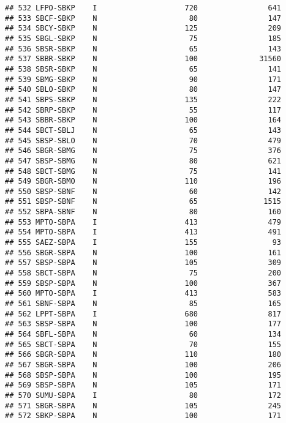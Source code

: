 \documentclass[
]{article}
\begin{document}
\begin{verbatim}
## 532 LFPO-SBKP    I                    720                641
## 533 SBCF-SBKP    N                     80                147
## 534 SBCY-SBKP    N                    125                209
## 535 SBGL-SBKP    N                     75                185
## 536 SBSR-SBKP    N                     65                143
## 537 SBBR-SBKP    N                    100              31560
## 538 SBSR-SBKP    N                     65                141
## 539 SBMG-SBKP    N                     90                171
## 540 SBLO-SBKP    N                     80                147
## 541 SBPS-SBKP    N                    135                222
## 542 SBRP-SBKP    N                     55                117
## 543 SBBR-SBKP    N                    100                164
## 544 SBCT-SBLJ    N                     65                143
## 545 SBSP-SBLO    N                     70                479
## 546 SBGR-SBMG    N                     75                376
## 547 SBSP-SBMG    N                     80                621
## 548 SBCT-SBMG    N                     75                141
## 549 SBGR-SBMO    N                    110                196
## 550 SBSP-SBNF    N                     60                142
## 551 SBSP-SBNF    N                     65               1515
## 552 SBPA-SBNF    N                     80                160
## 553 MPTO-SBPA    I                    413                479
## 554 MPTO-SBPA    I                    413                491
## 555 SAEZ-SBPA    I                    155                 93
## 556 SBGR-SBPA    N                    100                161
## 557 SBSP-SBPA    N                    105                309
## 558 SBCT-SBPA    N                     75                200
## 559 SBSP-SBPA    N                    100                367
## 560 MPTO-SBPA    I                    413                583
## 561 SBNF-SBPA    N                     85                165
## 562 LPPT-SBPA    I                    680                817
## 563 SBSP-SBPA    N                    100                177
## 564 SBFL-SBPA    N                     60                134
## 565 SBCT-SBPA    N                     70                155
## 566 SBGR-SBPA    N                    110                180
## 567 SBGR-SBPA    N                    100                206
## 568 SBSP-SBPA    N                    100                195
## 569 SBSP-SBPA    N                    105                171
## 570 SUMU-SBPA    I                     80                172
## 571 SBGR-SBPA    N                    105                245
## 572 SBKP-SBPA    N                    100                171

\end{verbatim}
\end{document}

